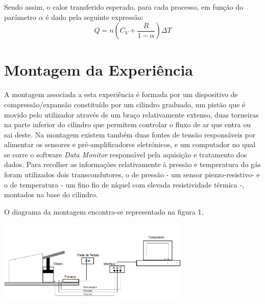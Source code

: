 \documentclass[9pt]{extarticle}
\begin{document}
\begin{multicols}{2}
\par Sendo assim, o calor transferido esperado, para cada processo, em função do parâmetro $\alpha$ é  dado pela seguinte expressão:
\begin{equation}
Q = n (C_V + \frac{R}{1-\alpha}) \Delta T
\end{equation} 

\section{Montagem da Experiência}


\par A montagem associada a esta experiência é formada por um dispositivo de compressão/expansão constituído por um cilindro graduado, um pistão que é movido pelo utilizador através de um braço relativamente extenso, duas torneiras na parte inferior do cilindro que permitem controlar o fluxo de ar que entra ou sai deste. Na montagem existem também duas fontes de tensão responsáveis por alimentar os sensores e pré-amplificadores eletrónicos, e um computador no qual se corre o software \textit{Data Monitor} responsável pela aquisição e tratamento dos dados. Para recolher as informações relativamente à pressão e temperatura do gás foram utilizados dois transcondutores, o de pressão - um sensor piezzo-resistivo- e o de temperatura - um fino fio de níquel com elevada resistividade térmica -, montados na base do cilindro. 

O diagrama da montagem encontra-se representado na figura 1.

\hspace{-0.8cm}
\begin{center}
\includegraphics[width=260pt]{diagrama.png}
\begin{center}
\par{}
\end{center}
\end{center}


\end{multicols}
\end{document}
